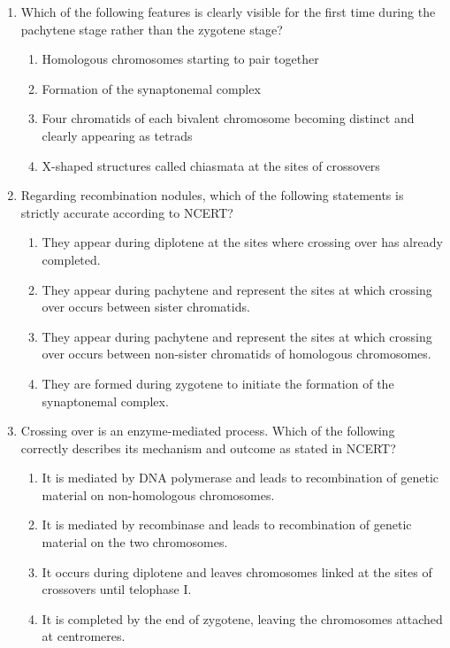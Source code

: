 \documentclass[11pt,a4paper]{article}
\begin{document}
\begin{enumerate}[label=\textbf{\arabic*.}]
\item Which of the following features is clearly visible for the first time during the pachytene stage rather than the zygotene stage?
\begin{enumerate}[label=(\Alph*)]
    \item Homologous chromosomes starting to pair together
    \item Formation of the synaptonemal complex
    \item Four chromatids of each bivalent chromosome becoming distinct and clearly appearing as tetrads
    \item X-shaped structures called chiasmata at the sites of crossovers
\end{enumerate}

\item Regarding recombination nodules, which of the following statements is strictly accurate according to NCERT?
\begin{enumerate}[label=(\Alph*)]
    \item They appear during diplotene at the sites where crossing over has already completed.
    \item They appear during pachytene and represent the sites at which crossing over occurs between sister chromatids.
    \item They appear during pachytene and represent the sites at which crossing over occurs between non-sister chromatids of homologous chromosomes.
    \item They are formed during zygotene to initiate the formation of the synaptonemal complex.
\end{enumerate}

\item Crossing over is an enzyme-mediated process. Which of the following correctly describes its mechanism and outcome as stated in NCERT?
\begin{enumerate}[label=(\Alph*)]
    \item It is mediated by DNA polymerase and leads to recombination of genetic material on non-homologous chromosomes.
    \item It is mediated by recombinase and leads to recombination of genetic material on the two chromosomes.
    \item It occurs during diplotene and leaves chromosomes linked at the sites of crossovers until telophase I.
    \item It is completed by the end of zygotene, leaving the chromosomes attached at centromeres.
\end{enumerate}


\end{enumerate}
\end{document}
